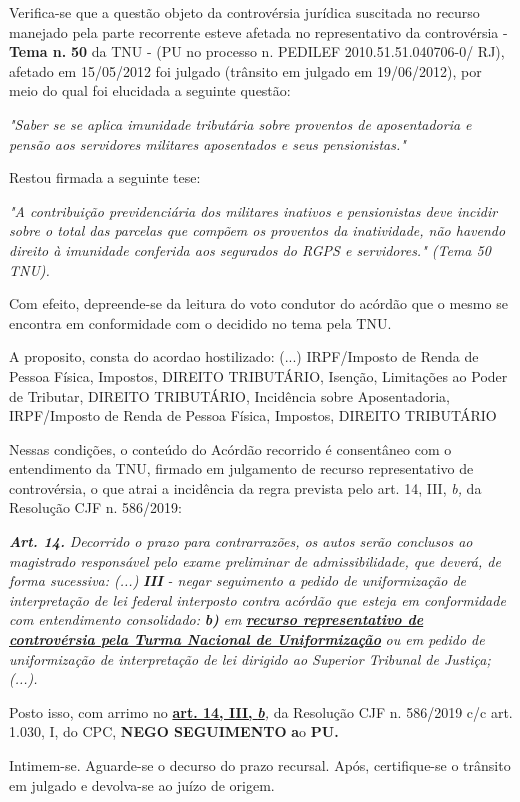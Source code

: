 \documentclass[12pt]{article}
\begin{document}
\justifying
\noindent Verifica-se que a questão objeto da controvérsia jurídica suscitada no recurso manejado pela parte recorrente esteve afetada no representativo da controvérsia - \textbf{Tema n. }\textbf{50} da TNU - (PU no processo n. PEDILEF 2010.51.51.040706-0/ RJ),  afetado em 15/05/2012 foi julgado (trânsito em julgado em 19/06/2012), por meio do qual foi elucidada a seguinte questão:

\noindent \textit{"Saber se se aplica imunidade tributária sobre proventos de aposentadoria e pensão aos servidores militares aposentados e seus pensionistas."}

\noindent Restou firmada a seguinte tese:

\noindent \textit{"A contribuição previdenciária dos militares inativos e pensionistas deve incidir sobre o total das parcelas que compõem os proventos da inatividade, não havendo direito à imunidade conferida aos segurados do RGPS e servidores." (Tema 50 TNU).}

\noindent Com efeito, depreende-se da leitura do voto condutor do acórdão que o mesmo se encontra em conformidade com o decidido no  tema pela TNU.

\noindent A proposito, consta do acordao hostilizado: (...) IRPF/Imposto de Renda de Pessoa Física, Impostos, DIREITO TRIBUTÁRIO, Isenção, Limitações ao Poder de Tributar, DIREITO TRIBUTÁRIO, Incidência sobre Aposentadoria, IRPF/Imposto de Renda de Pessoa Física, Impostos, DIREITO TRIBUTÁRIO

\noindent Nessas condições, o conteúdo do Acórdão recorrido é consentâneo com o entendimento da TNU, firmado em julgamento de recurso representativo de controvérsia, o que atrai a incidência da regra prevista pelo art. 14, III, \textit{b,} da Resolução CJF n. 586/2019:

\noindent \textit{\textbf{Art. 14.}}\textit{ Decorrido o prazo para contrarrazões, os autos serão conclusos ao magistrado responsável pelo exame preliminar de admissibilidade, que deverá, de forma sucessiva: (...) }\textit{\textbf{III }}\textit{- negar seguimento a pedido de uniformização de interpretação de lei federal interposto contra acórdão que esteja em conformidade com entendimento consolidado: }\textit{\textbf{b)}}\textit{ em }\uline{\textit{\textbf{recurso representativo de controvérsia pela Turma Nacional de Uniformização}}}\textit{ ou em pedido de uniformização de interpretação de lei dirigido ao Superior Tribunal de Justiça;(...).}

\noindent Posto isso, com arrimo no \uline{\textbf{art. 14, III, }}\uline{\textit{\textbf{b}}}\textit{,} da Resolução CJF n. 586/2019 c/c art. 1.030, I, do CPC, \textbf{NEGO SEGUIMENTO }\textbf{a}o\textbf{ PU}\textbf{.}

\noindent Intimem-se. Aguarde-se o decurso do prazo recursal. Após, certifique-se o trânsito em julgado e devolva-se ao juízo de origem.
\end{document}
